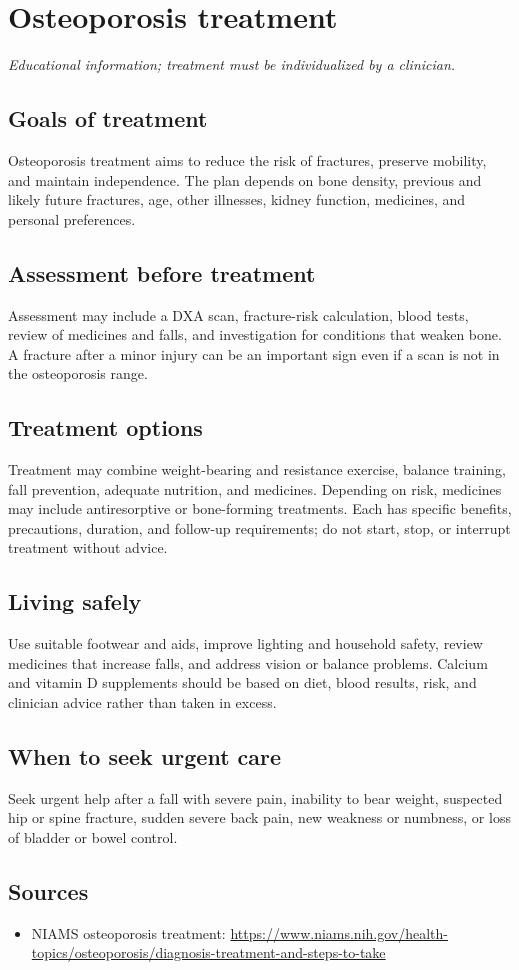 \chapter{Osteoporosis treatment}

\medskip
\noindent\textit{Educational information; treatment must be individualized by a clinician.}

\section*{Goals of treatment}
Osteoporosis treatment aims to reduce the risk of fractures, preserve mobility, and maintain independence. The plan depends on bone density, previous and likely future fractures, age, other illnesses, kidney function, medicines, and personal preferences.

\section*{Assessment before treatment}
Assessment may include a DXA scan, fracture-risk calculation, blood tests, review of medicines and falls, and investigation for conditions that weaken bone. A fracture after a minor injury can be an important sign even if a scan is not in the osteoporosis range.

\section*{Treatment options}
Treatment may combine weight-bearing and resistance exercise, balance training, fall prevention, adequate nutrition, and medicines. Depending on risk, medicines may include antiresorptive or bone-forming treatments. Each has specific benefits, precautions, duration, and follow-up requirements; do not start, stop, or interrupt treatment without advice.

\section*{Living safely}
Use suitable footwear and aids, improve lighting and household safety, review medicines that increase falls, and address vision or balance problems. Calcium and vitamin D supplements should be based on diet, blood results, risk, and clinician advice rather than taken in excess.

\section*{When to seek urgent care}
Seek urgent help after a fall with severe pain, inability to bear weight, suspected hip or spine fracture, sudden severe back pain, new weakness or numbness, or loss of bladder or bowel control.

\section*{Sources}
\begin{itemize}
\item NIAMS osteoporosis treatment: \url{https://www.niams.nih.gov/health-topics/osteoporosis/diagnosis-treatment-and-steps-to-take}
\end{itemize}
